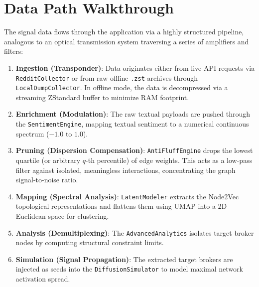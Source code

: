 \documentclass[12pt,a4paper]{report}
\begin{document}
\chapter{Data Path Walkthrough}
The signal data flows through the application via a highly structured pipeline, analogous to an optical transmission system traversing a series of amplifiers and filters:
\begin{enumerate}
    \item \textbf{Ingestion (Transponder)}: Data originates either from live API requests via \texttt{RedditCollector} or from raw offline \texttt{.zst} archives through \texttt{LocalDumpCollector}. In offline mode, the data is decompressed via a streaming ZStandard buffer to minimize RAM footprint.
    \item \textbf{Enrichment (Modulation)}: The raw textual payloads are pushed through the \texttt{SentimentEngine}, mapping textual sentiment to a numerical continuous spectrum ($-1.0$ to $1.0$).
    \item \textbf{Pruning (Dispersion Compensation)}: \texttt{AntiFluffEngine} drops the lowest quartile (or arbitrary $q$-th percentile) of edge weights. This acts as a low-pass filter against isolated, meaningless interactions, concentrating the graph signal-to-noise ratio.
    \item \textbf{Mapping (Spectral Analysis)}: \texttt{LatentModeler} extracts the Node2Vec topological representations and flattens them using UMAP into a 2D Euclidean space for clustering.
    \item \textbf{Analysis (Demultiplexing)}: The \texttt{AdvancedAnalytics} isolates target broker nodes by computing structural constraint limits.
    \item \textbf{Simulation (Signal Propagation)}: The extracted target brokers are injected as seeds into the \texttt{DiffusionSimulator} to model maximal network activation spread.
\end{enumerate}
\end{document}
